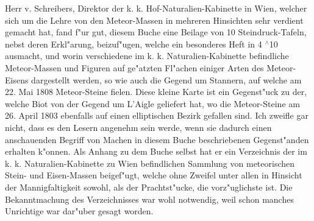 \documentclass[a4paper, 11pt, oneside, polutonikogreek, german]{article}
\begin{document}
Herr v. Schreibers, Direktor der k. k. Hof-Naturalien-Kabinette in Wien, welcher sich um die Lehre von den Meteor-Massen in mehreren Hinsichten sehr verdient gemacht hat, fand f"ur gut, diesem Buche eine Beilage von 10 Steindruck-Tafeln, nebst deren Erkl"arung, beizuf"ugen, welche ein besonderes Heft in 4 $^\wedge$10 ausmacht, und worin verschiedene im k. k. Naturalien-Kabinette befindliche Meteor-Massen und Figuren auf ge"atzten Fl"achen einiger Arten des Meteor-Eisens dargestellt werden, so wie auch die Gegend um Stannern, auf welche am 22. Mai 1808 Meteor-Steine fielen. Diese kleine Karte ist ein Gegenst"uck zu der, welche Biot von der Gegend um L'Aigle geliefert hat, wo die Meteor-Steine am 26. April 1803 ebenfalls auf einen elliptischen Bezirk gefallen sind. Ich zweifle gar nicht, dass es den Lesern angenehm sein werde, wenn sie dadurch einen anschauenden Begriff von Machen in diesem Buche beschriebenen Gegenst"anden erhalten k"onnen. Als Anhang zu dem Buche selbst hat er ein Verzeichnis der im k. k. Naturalien-Kabinette zu Wien befindlichen Sammlung von meteorischen Stein- und Eisen-Massen beigef"ugt, welche ohne Zweifel unter allen in Hinsicht der Mannigfaltigkeit sowohl, als der Prachtst"ucke, die vorz"uglichste ist. Die Bekanntmachung des Verzeichnisses war wohl notwendig, weil schon manches Unrichtige war dar"uber gesagt worden.
\end{document}
